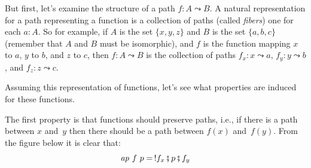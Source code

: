 \documentclass[11pt]{article}
\newcommand{\pc}{\fatsemi}                 %
\renewcommand{\path}{\leadsto}
\newcommand{\ap}[2]{\mathit{ap}~#1~#2}
\begin{document}
But first, let's examine the structure of a path $f : A \path B$. A natural
representation for a path representing a function is a collection of paths
(called \emph{fibers}) one for each $a : A$. So for example, if $A$ is the
set $\{ x , y , z \}$ and $B$ is the set $\{ a , b , c \}$ (remember that $A$
and $B$ must be isomorphic), and $f$ is the function mapping $x$ to $a$, $y$
to $b$, and $z$ to $c$, then $f : A \path B$ is the collection of paths $f_x
: x \path a$, $f_y : y \path b$, and $f_z : z \path c$.

Assuming this representation of functions, let's see what properties are
induced for these functions. 

The first property is that functions should preserve paths, i.e., if there is
a path between $x$ and~$y$ then there should be a path between $f(x)$
and~$f(y)$. From the figure below it is clear that:
\[ 
\ap{f}{p} = \, !f_x \pc p \pc f_y
\]

\begin{center}
\end{center}
\end{document}
